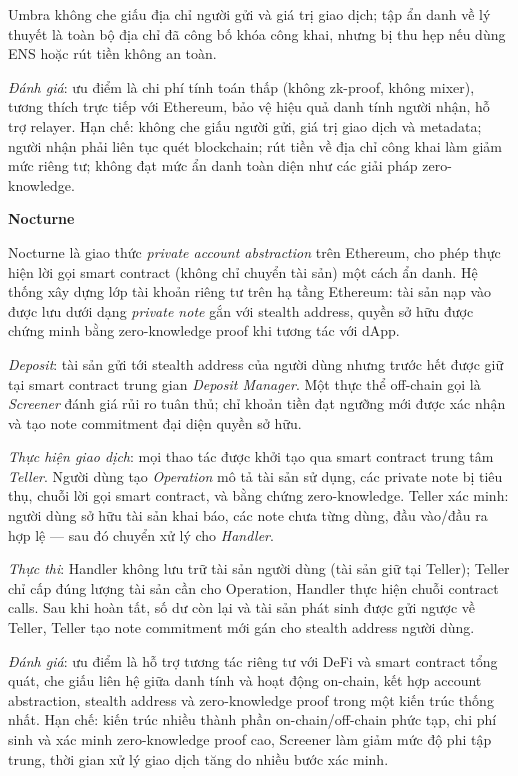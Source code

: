\documentclass[../DoAn.tex]{subfiles}
\begin{document}
Umbra không che giấu địa chỉ người gửi và giá trị giao dịch; tập ẩn danh về lý thuyết là toàn bộ địa chỉ đã công bố khóa công khai, nhưng bị thu hẹp nếu dùng ENS hoặc rút tiền không an toàn.

\textit{Đánh giá}: ưu điểm là chi phí tính toán thấp (không zk-proof, không mixer), tương thích trực tiếp với Ethereum, bảo vệ hiệu quả danh tính người nhận, hỗ trợ relayer. Hạn chế: không che giấu người gửi, giá trị giao dịch và metadata; người nhận phải liên tục quét blockchain; rút tiền về địa chỉ công khai làm giảm mức riêng tư; không đạt mức ẩn danh toàn diện như các giải pháp zero-knowledge.

\textbf{Nocturne}

Nocturne là giao thức \textit{private account abstraction} trên Ethereum, cho phép thực hiện lời gọi smart contract (không chỉ chuyển tài sản) một cách ẩn danh. Hệ thống xây dựng lớp tài khoản riêng tư trên hạ tầng Ethereum: tài sản nạp vào được lưu dưới dạng \textit{private note} gắn với stealth address, quyền sở hữu được chứng minh bằng zero-knowledge proof khi tương tác với dApp.

\textit{Deposit}: tài sản gửi tới stealth address của người dùng nhưng trước hết được giữ tại smart contract trung gian \textit{Deposit Manager}. Một thực thể off-chain gọi là \textit{Screener} đánh giá rủi ro tuân thủ; chỉ khoản tiền đạt ngưỡng mới được xác nhận và tạo note commitment đại diện quyền sở hữu.

\textit{Thực hiện giao dịch}: mọi thao tác được khởi tạo qua smart contract trung tâm \textit{Teller}. Người dùng tạo \textit{Operation} mô tả tài sản sử dụng, các private note bị tiêu thụ, chuỗi lời gọi smart contract, và bằng chứng zero-knowledge. Teller xác minh: người dùng sở hữu tài sản khai báo, các note chưa từng dùng, đầu vào/đầu ra hợp lệ — sau đó chuyển xử lý cho \textit{Handler}.

\textit{Thực thi}: Handler không lưu trữ tài sản người dùng (tài sản giữ tại Teller); Teller chỉ cấp đúng lượng tài sản cần cho Operation, Handler thực hiện chuỗi contract calls. Sau khi hoàn tất, số dư còn lại và tài sản phát sinh được gửi ngược về Teller, Teller tạo note commitment mới gán cho stealth address người dùng.

\textit{Đánh giá}: ưu điểm là hỗ trợ tương tác riêng tư với DeFi và smart contract tổng quát, che giấu liên hệ giữa danh tính và hoạt động on-chain, kết hợp account abstraction, stealth address và zero-knowledge proof trong một kiến trúc thống nhất. Hạn chế: kiến trúc nhiều thành phần on-chain/off-chain phức tạp, chi phí sinh và xác minh zero-knowledge proof cao, Screener làm giảm mức độ phi tập trung, thời gian xử lý giao dịch tăng do nhiều bước xác minh.
\end{document}
